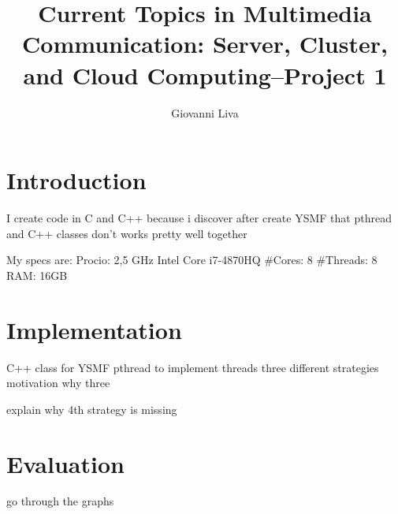 \documentclass[]{article}
\title{Current Topics in Multimedia Communication: Server, Cluster, and Cloud Computing--Project 1}
\author{Giovanni Liva}
\begin{document}
\maketitle


\section*{Introduction}
I create code in C and C++ because i discover after create YSMF that pthread and C++ classes don't works pretty well together

My specs are:
Procio: 2,5 GHz Intel Core i7-4870HQ
#Cores: 8
#Threads: 8
RAM: 16GB


\section*{Implementation}

C++ class for YSMF
pthread to implement threads
three different strategies
motivation why three 

explain why 4th strategy is missing

\section*{Evaluation}

go through the graphs
\end{document}
